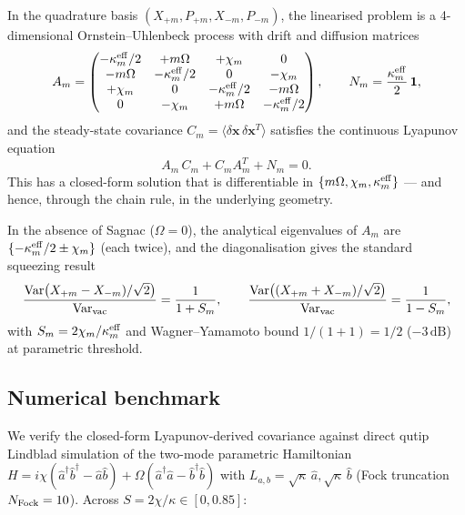 \documentclass[11pt]{article}
\newcommand{\eff}{{\rm eff}}
\begin{document}
In the quadrature basis $(X_{+m}, P_{+m}, X_{-m}, P_{-m})$, the linearised
problem is a 4-dimensional Ornstein--Uhlenbeck process with drift and
diffusion matrices
\begin{equation}
  A_m = \begin{pmatrix}
    -\kappa_m^\eff/2 & +m\Omega & +\chi_m & 0 \\
    -m\Omega & -\kappa_m^\eff/2 & 0 & -\chi_m \\
    +\chi_m & 0 & -\kappa_m^\eff/2 & -m\Omega \\
    0 & -\chi_m & +m\Omega & -\kappa_m^\eff/2
  \end{pmatrix},
  \qquad
  N_m = \frac{\kappa_m^\eff}{2}\,\mathbf{1},
\end{equation}
and the steady-state covariance $C_m = \langle\delta\mathbf{x}\,
\delta\mathbf{x}^T\rangle$ satisfies the continuous Lyapunov equation
\begin{equation}
  A_m\,C_m + C_m A_m^T + N_m = 0.
  \label{eq:lyapunov}
\end{equation}
This has a closed-form solution that is differentiable in
$\{m\Omega, \chi_m, \kappa_m^\eff\}$ --- and hence, through the
chain rule, in the underlying geometry.

In the absence of Sagnac ($\Omega = 0$), the analytical eigenvalues of
$A_m$ are $\{-\kappa_m^\eff/2 \pm \chi_m\}$ (each twice), and the
diagonalisation gives the standard squeezing result
\begin{equation}
  \frac{\mathrm{Var}\bigl(X_{+m}-X_{-m})/\sqrt 2\bigr)}{\mathrm{Var}_{\rm vac}}
  = \frac{1}{1+S_m},\qquad
  \frac{\mathrm{Var}\bigl((X_{+m}+X_{-m})/\sqrt 2\bigr)}{\mathrm{Var}_{\rm vac}}
  = \frac{1}{1-S_m},
\end{equation}
with $S_m = 2\chi_m/\kappa_m^\eff$ and Wagner--Yamamoto bound
$1/(1+1) = 1/2$ ($-3\,\mathrm{dB}$) at parametric threshold.

\subsection{Numerical benchmark}
\label{sec:bench}

We verify the closed-form Lyapunov-derived covariance against direct
qutip Lindblad simulation of the two-mode parametric Hamiltonian
$H = i\chi(\hat a^\dagger\hat b^\dagger - \hat a\hat b) +
\Omega(\hat a^\dagger\hat a - \hat b^\dagger\hat b)$ with
$L_{a,b} = \sqrt\kappa\,\hat a, \sqrt\kappa\,\hat b$
(Fock truncation $N_{\rm Fock}=10$).  Across $S=2\chi/\kappa\in[0,0.85]$:
\end{document}
